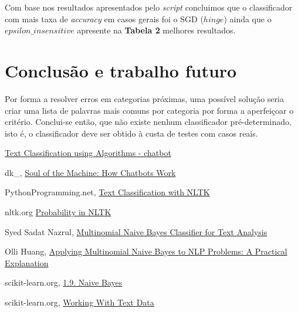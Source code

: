 \documentclass[12pt]{article}
\begin{document}
Com base nos resultados apresentados pelo \textit{script} concluimos que o classificador com mais taxa de \textit{accuracy}
em casos gerais foi o SGD ($hinge$) ainda que o $epsilon\_insensitive$ apresente na \textbf{Tabela 2} melhores resultados.

\section*{Conclusão e trabalho futuro}

Por forma a resolver erros em categorias próximas, uma possível solução seria criar uma lista de palavras
mais comuns por categoria por forma a aperfeiçoar o critério.
Conclui-se então, que não existe nenhum classificador pré-determinado, isto é, o classificador deve ser obtido
à custa de testes com casos reais.


\begin{thebibliography}{9}

      \href{https://chatbotslife.com/text-classification-using-algorithms-e4d50dcba45}{Text Classification using Algorithms - chatbot}
    
    dk\_,
    \href{https://medium.com/@gk_/how-chat-bots-work-dfff656a35e2}{Soul of the Machine: How Chatbots Work}

    PythonProgramming.net,
    \href{https://pythonprogramming.net/text-classification-nltk-tutorial/}{Text Classification with NLTK}

    nltk.org
    \href{http://www.nltk.org/howto/probability.html}{Probability in NLTK}

    Syed Sadat Nazrul,
    \href{https://towardsdatascience.com/multinomial-naive-bayes-classifier-for-text-analysis-python-8dd6825ece67}{Multinomial Naive Bayes Classifier for Text Analysis}
    
    Olli Huang,
    \href{https://syncedreview.com/2017/07/17/applying-multinomial-naive-bayes-to-nlp-problems-a-practical-explanation/}{Applying Multinomial Naive Bayes to NLP Problems: A Practical Explanation}

    scikit-learn.org,
    \href{http://scikit-learn.org/stable/modules/naive_bayes.html}{1.9. Naive Bayes}

    scikit-learn.org,
    \href{http://scikit-learn.org/stable/tutorial/text_analytics/working_with_text_data.html}{Working With Text Data}

    \end{thebibliography}
\end{document}
